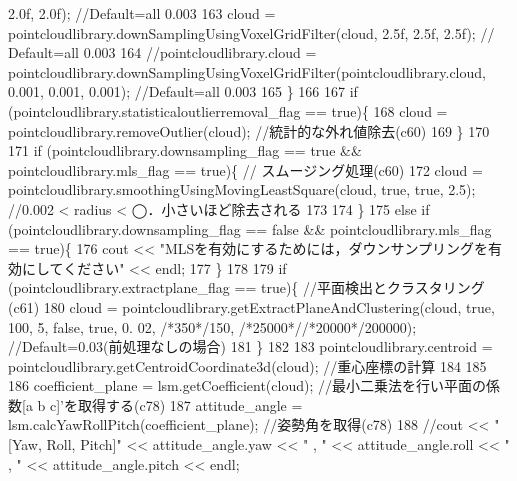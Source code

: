 \begin{DoxyCode}
{       2.0f, 2.0f); //Default=all 0.003}
163                 cloud = pointcloudlibrary.downSamplingUsingVoxelGridFilter(cloud, 2.5f, 2.5f, 2.5f); \textcolor{comment}{//
      Default=all 0.003}
164                 \textcolor{comment}{//pointcloudlibrary.cloud =
       pointcloudlibrary.downSamplingUsingVoxelGridFilter(pointcloudlibrary.cloud, 0.001, 0.001, 0.001); //Default=all 0.003}
165             \}
166 
167             \textcolor{keywordflow}{if} (pointcloudlibrary.statisticaloutlierremoval\_flag == \textcolor{keyword}{true})\{
168                 cloud = pointcloudlibrary.removeOutlier(cloud); \textcolor{comment}{//統計的な外れ値除去(c60)}
169             \}
170 
171             \textcolor{keywordflow}{if} (pointcloudlibrary.downsampling\_flag == \textcolor{keyword}{true} && pointcloudlibrary.mls\_flag == \textcolor{keyword}{true})\{  \textcolor{comment}{//
      スムージング処理(c60)}
172                 cloud = pointcloudlibrary.smoothingUsingMovingLeastSquare(cloud, \textcolor{keyword}{true}, \textcolor{keyword}{true}, 2.5); \textcolor{comment}{//0.002
       < radius < ◯．小さいほど除去される}
173 
174             \}
175             \textcolor{keywordflow}{else} \textcolor{keywordflow}{if} (pointcloudlibrary.downsampling\_flag == \textcolor{keyword}{false} && pointcloudlibrary.mls\_flag == \textcolor{keyword}{true})\{
176                 cout << \textcolor{stringliteral}{"MLSを有効にするためには，ダウンサンプリングを有効にしてください"} << endl;
177             \}
178 
179             \textcolor{keywordflow}{if} (pointcloudlibrary.extractplane\_flag == \textcolor{keyword}{true})\{   \textcolor{comment}{//平面検出とクラスタリング(c61)}
180                 cloud = pointcloudlibrary.getExtractPlaneAndClustering(cloud, \textcolor{keyword}{true}, 100, 5, \textcolor{keyword}{false}, \textcolor{keyword}{true}, 0.
      02, \textcolor{comment}{/*350*/}150, \textcolor{comment}{/*25000*/}\textcolor{comment}{/*20000*/}200000); \textcolor{comment}{//Default=0.03(前処理なしの場合)}
181             \}
182 
183             pointcloudlibrary.centroid = pointcloudlibrary.getCentroidCoordinate3d(cloud); \textcolor{comment}{//重心座標の計算}
184             
185             
186             coefficient\_plane = lsm.getCoefficient(cloud); \textcolor{comment}{//最小二乗法を行い平面の係数[a b c]'を取得する(c78)}
187             attitude\_angle = lsm.calcYawRollPitch(coefficient\_plane); \textcolor{comment}{//姿勢角を取得(c78)}
188             \textcolor{comment}{//cout << "[Yaw, Roll, Pitch]" << attitude\_angle.yaw << " , " << attitude\_angle.roll << " , "
       << attitude\_angle.pitch << endl;}

\end{DoxyCode}

